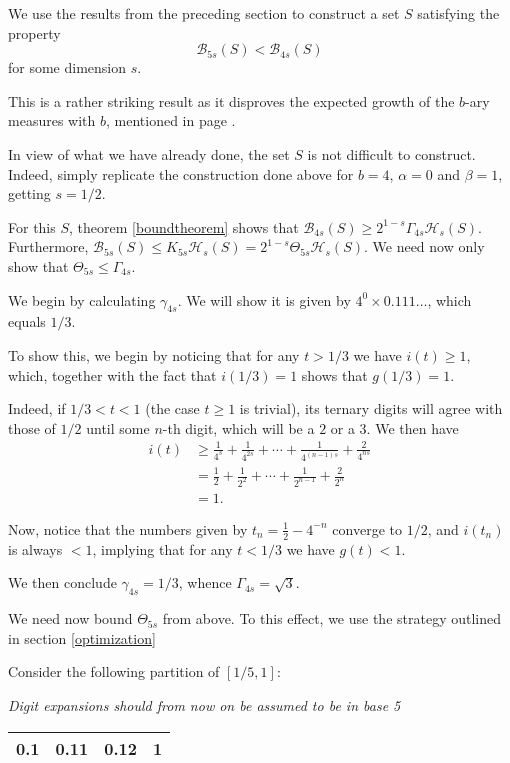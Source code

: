 \documentclass[11pt, reqno]{amsart}
\newcommand{\HH}{\mathcal{H}}
\newcommand{\BB}{\mathcal{B}}
\begin{document}
We use the results from the preceding section to construct a set $S$ satisfying the property
\[ \BB_{5s}(S) < \BB_{4s}(S) \]
for some dimension $s$.

This is a rather striking result as it disproves the expected growth of the $b$-ary measures with $b$, mentioned in page \pageref{falseconjecture}.

In view of what we have already done, the set $S$ is not difficult to construct. Indeed, simply replicate the construction done above for $b = 4$, $\alpha = 0$  and $\beta = 1$, getting $s = 1/2$.

For this $S$, theorem \ref{boundtheorem} shows that $\BB_{4s}(S) \geq 2^{1-s} \Gamma_{4s} \HH_s(S)$. Furthermore, $\BB_{5s}(S) \leq K_{5s} \HH_s(S) = 2^{1-s} \Theta_{5s} \HH_s(S)$. We need now only show that  $\Theta_{5s} \leq \Gamma_{4s}$.

We begin by calculating $\gamma_{4s}$. We will show it is given by $4^0 \times 0.111\dots$, which equals $1/3$.

To show this, we begin by noticing that for any $t > 1/3$ we have $i(t) \geq 1$, which, together with the fact that $i(1/3) = 1$ shows that $g(1/3) = 1$.

Indeed, if $1/3 < t < 1$ (the case $t \geq 1$ is trivial), its ternary digits will agree with those of $1/2$ until some $n$-th digit, which will be a $2$ or a $3$. We then have
\begin{align*}
i(t) &\geq \frac 1 {4^s} + \frac 1 {4^{2s}} + \cdots + \frac 1 {4^{(n-1)s}} + \frac 2 {4^{ns}} \\
&= \frac 1 {2} + \frac 1 {2^2} + \cdots + \frac 1 {2^{n-1}} + \frac 2 {2^n} \\
&= 1.
\end{align*}

Now, notice that the numbers given by $t_n = \frac 1 2 - 4^{-n}$ converge to $1/2$, and $i(t_n)$ is always $< 1$, implying that for any $t < 1/3$ we have $g(t) < 1$.

We then conclude $\gamma_{4s} = 1/3$, whence $\Gamma_{4s} = \sqrt 3$.

We need now bound $\Theta_{5s}$ from above. To this effect, we use the strategy outlined in section \ref{optimization}

Consider the following partition of $\left[1/5, 1 \right]$:

\emph{Digit expansions should from now on be assumed to be in base 5}

\begin{center}
\begin{tabular}{| c | @{\qquad\qquad} | c | @{\qquad\qquad} | c | @{\qquad\qquad} | c |}
\hline
0.1 & 0.11 & 0.12 & 1 \\
\hline
\end{tabular}
\end{center}
\end{document}
